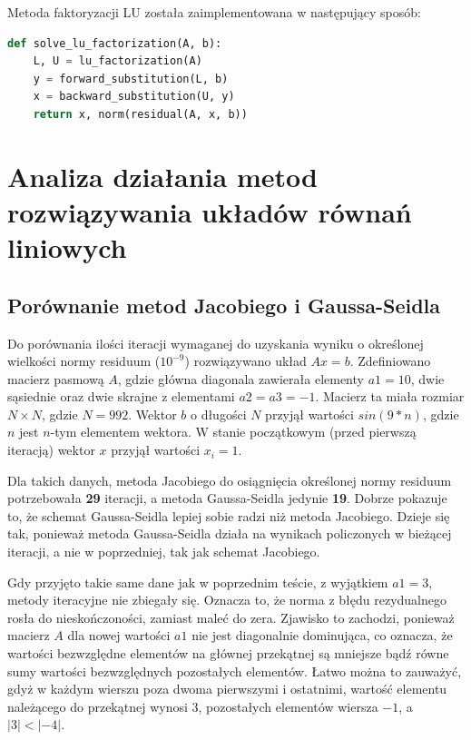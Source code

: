 \documentclass{article}
\begin{document}
Metoda faktoryzacji LU została zaimplementowana w następujący sposób:

\vspace{0.75em}
\begin{lstlisting}[language=Python, caption=Implementacja metody faktoryzacji LU]
def solve_lu_factorization(A, b):
    L, U = lu_factorization(A)
    y = forward_substitution(L, b)
    x = backward_substitution(U, y)
    return x, norm(residual(A, x, b))
\end{lstlisting}

\newpage

\section{Analiza działania metod rozwiązywania układów równań liniowych}

\subsection{Porównanie metod Jacobiego i Gaussa-Seidla}

Do porównania ilości iteracji wymaganej do uzyskania wyniku o określonej wielkości normy residuum ($10^{-9}$) rozwiązywano układ $Ax=b$. Zdefiniowano macierz pasmową $A$, gdzie główna diagonala zawierała elementy $a1=10$, dwie sąsiednie oraz dwie skrajne z elementami $a2=a3=-1$. Macierz ta miała rozmiar $N\times N$, gdzie $N=992$. Wektor $b$ o długości $N$ przyjął wartości $sin(9*n)$, gdzie $n$ jest $n$-tym elementem wektora. W stanie początkowym (przed pierwszą iteracją) wektor $x$ przyjął wartości $x_i=1$.

Dla takich danych, metoda Jacobiego do osiągnięcia określonej normy residuum potrzebowała \textbf{29} iteracji, a metoda Gaussa-Seidla jedynie \textbf{19}. Dobrze pokazuje to, że schemat Gaussa-Seidla lepiej sobie radzi niż metoda Jacobiego. Dzieje się tak, ponieważ metoda Gaussa-Seidla działa na wynikach policzonych w bieżącej iteracji, a nie w poprzedniej, tak jak schemat Jacobiego.

Gdy przyjęto takie same dane jak w poprzednim teście, z wyjątkiem $a1=3$, metody iteracyjne nie zbiegały się. Oznacza to, że norma z błędu rezydualnego rosła do nieskończoności, zamiast maleć do zera. Zjawisko to zachodzi, ponieważ macierz $A$ dla nowej wartości $a1$ nie jest diagonalnie dominująca, co oznacza, że wartości bezwzględne elementów na głównej przekątnej są mniejsze bądź równe sumy wartości bezwzględnych pozostałych elementów. Łatwo można to zauważyć, gdyż w każdym wierszu poza dwoma pierwszymi i ostatnimi, wartość elementu należącego do przekątnej wynosi $3$, pozostałych elementów wiersza $-1$, a $|3| < |-4|$.
\end{document}
